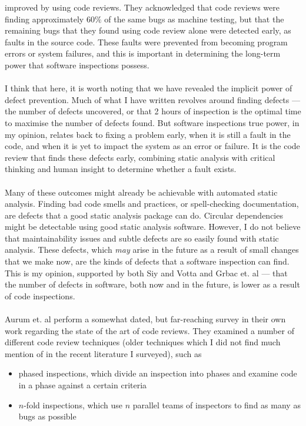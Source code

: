 improved by using code reviews.
They acknowledged that code reviews were finding approximately 60$\%$ of the same bugs as machine testing, but
that the remaining bugs that they found using code review alone were detected early, as faults in
the source code.
These faults were prevented from becoming program errors or system failures, and this is important
in determining the long-term power that software inspections possess.\\
\\
I think that here, it is worth noting that we have revealed the implicit power of defect prevention.
Much of what I have written revolves around finding defects --- the number of defects uncovered, or
that 2 hours of inspection is the optimal time to maximise the number of defects found.
But software inspections true power, in my opinion, relates back to fixing a problem early, when it
is still a fault in the code, and when it is yet to impact the system as an error or failure.
It is the code review that finds these defects early, combining static analysis with critical
thinking and human insight to determine whether a fault exists.\\
\\
Many of these outcomes might already be achievable with automated static analysis.
Finding bad code smells and practices, or spell-checking documentation, are defects that a good
static analysis package can do.
Circular dependencies might be detectable using good static analysis software.
However, I do not believe that maintainability issues and subtle defects are so easily found with
static analysis.
These defects, which {\it may} arise in the future as a result of small changes that we make now,
are the kinds of defects that a software inspection can find.
This is my opinion, supported by both Siy and Votta \cite{siy2001does} and Grbac et. al
\cite{grbac2012quantifying} --- that the number of defects in software, both now and in the future,
is lower as a result of code inspections.\\
\\
Aurum et. al \cite{aurum2002state} perform a somewhat dated, but far-reaching survey in their own
work regarding the state of the art of code reviews.
They examined a number of different code review techniques (older techniques which I did not find
much mention of in the recent literature I surveyed), such as
\begin{itemize}
	\item phased inspections, which divide an inspection into phases and examine code in a phase
		against a certain criteria
	\item $n$-fold inspections, which use $n$ parallel teams of inspectors to find as many as bugs as
		possible
\end{itemize}

